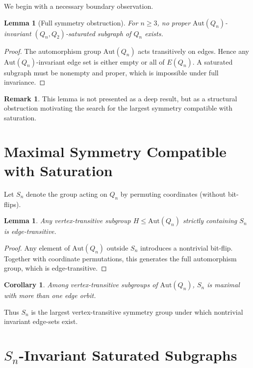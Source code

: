 \documentclass[11pt]{article}
\theoremstyle{plain}
\newtheorem{lemma}[theorem]{Lemma}
\newtheorem{corollary}[theorem]{Corollary}
\theoremstyle{definition}
\newtheorem{remark}[theorem]{Remark}
\newcommand{\Qn}{Q_n}
\newcommand{\Aut}{\mathrm{Aut}}
\begin{document}
We begin with a necessary boundary observation.

\begin{lemma}[Full symmetry obstruction]
For $n\ge3$, no proper $\Aut(\Qn)$-invariant $(Q_n,Q_2)$-saturated subgraph of $\Qn$ exists.
\end{lemma}

\begin{proof}
The automorphism group $\Aut(\Qn)$ acts transitively on edges.  
Hence any $\Aut(\Qn)$-invariant edge set is either empty or all of $E(\Qn)$.  
A saturated subgraph must be nonempty and proper, which is impossible under full invariance.
\end{proof}

\begin{remark}
This lemma is not presented as a deep result, but as a structural obstruction motivating the search for the largest symmetry compatible with saturation.
\end{remark}

\section{Maximal Symmetry Compatible with Saturation}

Let $S_n$ denote the group acting on $\Qn$ by permuting coordinates (without bit-flips).

\begin{lemma}
Any vertex-transitive subgroup $H\le\Aut(\Qn)$ strictly containing $S_n$ is edge-transitive.
\end{lemma}

\begin{proof}
Any element of $\Aut(\Qn)$ outside $S_n$ introduces a nontrivial bit-flip.  
Together with coordinate permutations, this generates the full automorphism group, which is edge-transitive.
\end{proof}

\begin{corollary}
Among vertex-transitive subgroups of $\Aut(\Qn)$, $S_n$ is maximal with more than one edge orbit.
\end{corollary}

Thus $S_n$ is the largest vertex-transitive symmetry group under which nontrivial invariant edge-sets exist.

\section{$S_n$-Invariant Saturated Subgraphs}
\end{document}
